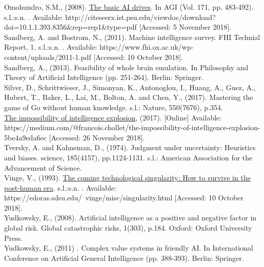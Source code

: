 \documentclass[11pt]{article}
\begin{document}
Omohundro, S.M., (2008). \underline{The basic AI drives}. In AGI (Vol. 171, pp. 483-492). s.l.:s.n. . Available: http://citeseerx.ist.psu.edu/viewdoc/download?doi=10.1.1.393.8356\&rep=rep1\&type=pdf [Accessed: 5 November 2018].\\


Sandberg, A. and Bostrom, N., (2011). Machine intelligence survey. FHI Technial Report, 1. s.l.:s.n. . Available: https://www.fhi.ox.ac.uk/wp-content/uploads/2011-1.pdf [Accessed: 10 October 2018]. \\

Sandberg, A., (2013). Feasibility of whole brain emulation. In Philosophy and Theory of Artificial Intelligence (pp. 251-264). Berlin: Springer. \\

Silver, D., Schrittwieser, J., Simonyan, K., Antonoglou, I., Huang, A., Guez, A., Hubert, T., Baker, L., Lai, M., Bolton, A. and Chen, Y., (2017). Mastering the game of Go without human knowledge. s.l.: Nature, 550(7676), p.354. \\

\underline{The impossibility of intelligence explosion}, (2017). [Online] Available: https://medium.com/@francois.chollet/the-impossibility-of-intelligence-explosion-5be4a9eda6ec [Accessed: 26 November 2018]. \\

Tversky, A. and Kahneman, D., (1974). Judgment under uncertainty: Heuristics and biases. science, 185(4157), pp.1124-1131. s.l.: American Association for the Advancement of Science.\\

Vinge, V., (1993). \underline{The coming technological singularity: How to survive in the post-human era}. s.l.:s.n. . Available: https://edoras.sdsu.edu/~vinge/misc/singularity.html [Accessed: 10 October 2018].\\

Yudkowsky, E., (2008). Artificial intelligence as a positive and negative factor in global risk. Global catastrophic risks, 1(303), p.184. Oxford: Oxford University Press.\\

Yudkowsky, E., (2011) . Complex value systems in friendly AI. In International Conference on Artificial General Intelligence (pp. 388-393). Berlin: Springer. \\ 
\end{document}
